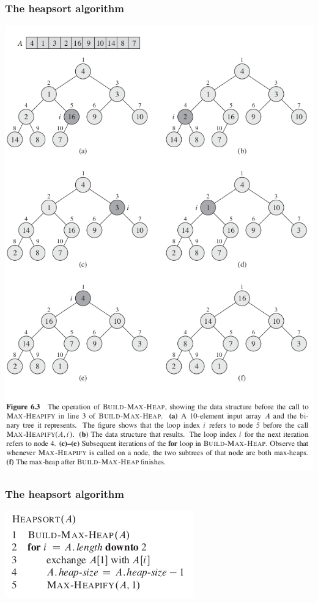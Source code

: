 \documentclass[11pt]{article}
\begin{document}
\subsubsection{The heapsort algorithm}
\label{sec-3-1-4}
\includegraphics[width=.9\linewidth]{pics/c6_build_max_heap_fig.png} \\

\subsubsection{The heapsort algorithm}
\label{sec-3-1-5}
\includegraphics[width=.9\linewidth]{pics/c6_heapsort.png} \\
\end{document}
